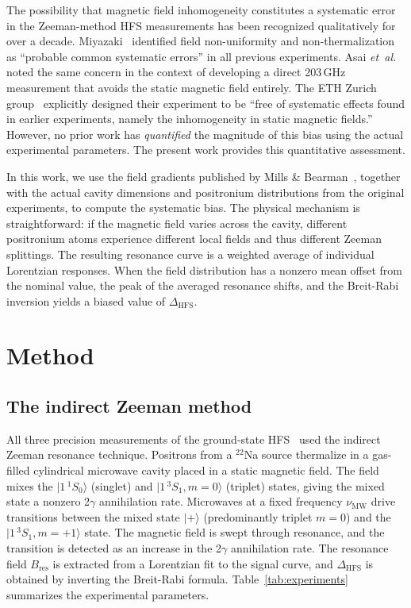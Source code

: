 \documentclass[twocolumn,pra,aps,superscriptaddress,floatfix,10pt]{revtex4-2}
\begin{document}
The possibility that magnetic field inhomogeneity constitutes a systematic error in the Zeeman-method HFS measurements has been recognized qualitatively for over a decade. Miyazaki~\cite{Miyazaki2010} identified field non-uniformity and non-thermalization as ``probable common systematic errors'' in all previous experiments. Asai \textit{et~al.}~\cite{Asai2012} noted the same concern in the context of developing a direct 203\,GHz measurement that avoids the static magnetic field entirely. The ETH Zurich group~\cite{Heiss2018} explicitly designed their experiment to be ``free of systematic effects found in earlier experiments, namely the inhomogeneity in static magnetic fields.'' However, no prior work has \emph{quantified} the magnitude of this bias using the actual experimental parameters. The present work provides this quantitative assessment.

In this work, we use the field gradients published by Mills \& Bearman~\cite{Mills1975}, together with the actual cavity dimensions and positronium distributions from the original experiments, to compute the systematic bias. The physical mechanism is straightforward: if the magnetic field varies across the cavity, different positronium atoms experience different local fields and thus different Zeeman splittings. The resulting resonance curve is a weighted average of individual Lorentzian responses. When the field distribution has a nonzero mean offset from the nominal value, the peak of the averaged resonance shifts, and the Breit-Rabi inversion yields a biased value of $\Delta_\mathrm{HFS}$.

\section{Method}
\label{sec:method}

\subsection{The indirect Zeeman method}
\label{sec:zeeman}

All three precision measurements of the ground-state HFS~\cite{Mills1975,Ritter1984,Ishida2014} used the indirect Zeeman resonance technique. Positrons from a $^{22}$Na source thermalize in a gas-filled cylindrical microwave cavity placed in a static magnetic field. The field mixes the $|1\,^1S_0\rangle$ (singlet) and $|1\,^3S_1, m=0\rangle$ (triplet) states, giving the mixed state a nonzero 2$\gamma$ annihilation rate. Microwaves at a fixed frequency $\nu_\mathrm{MW}$ drive transitions between the mixed state $|+\rangle$ (predominantly triplet $m=0$) and the $|1\,^3S_1, m=+1\rangle$ state. The magnetic field is swept through resonance, and the transition is detected as an increase in the 2$\gamma$ annihilation rate. The resonance field $B_\mathrm{res}$ is extracted from a Lorentzian fit to the signal curve, and $\Delta_\mathrm{HFS}$ is obtained by inverting the Breit-Rabi formula. Table~\ref{tab:experiments} summarizes the experimental parameters.
\end{document}
